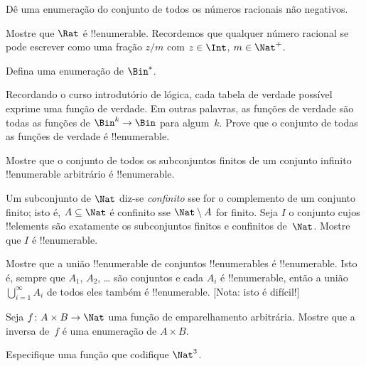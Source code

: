 \documentclass[../../../include/open-logic-section]{subfiles}
\begin{document}
\begin{prob}
Dê uma enumeração do conjunto de todos os números racionais não negativos.
\end{prob}

\begin{prob}
Mostre que $\Rat$ é !!{enumerable}. Recordemos que qualquer número racional
se pode escrever como uma fração $z/m$ com $z \in \Int$, $m \in \Nat^+$.
\end{prob}

\begin{prob}
Defina uma enumeração de $\Bin^*$.
\end{prob}

\begin{prob}
Recordando o curso introdutório de lógica, cada tabela de verdade possível
exprime uma função de verdade. Em outras palavras, as funções de verdade são todas
as funções de $\Bin^k \to \Bin$ para algum~$k$. Prove que o conjunto de todas as
funções de verdade é !!{enumerable}.
\end{prob}

\begin{prob}
Mostre que o conjunto de todos os subconjuntos finitos de um conjunto infinito
!!{enumerable} arbitrário é !!{enumerable}.
\end{prob}

\begin{prob}
Um subconjunto de $\Nat$ diz-se \emph{confinito} sse for o complemento de um
conjunto finito; isto é, $A \subseteq \Nat$ é confinito sse $\Nat\setminus A$ for
finito. Seja $I$ o conjunto cujos !!{element}s são exatamente os subconjuntos
finitos e confinitos de~$\Nat$. Mostre que $I$ é !!{enumerable}.
\end{prob}

\begin{prob}
Mostre que a união !!{enumerable} de conjuntos !!{enumerable}s é !!{enumerable}.
Isto é, sempre que $A_1$, $A_2$, \dots{} são conjuntos e cada $A_i$ é
!!{enumerable}, então a união $\bigcup_{i=1}^\infty A_i$ de todos eles também é
!!{enumerable}. [Nota: isto é difícil!]
\end{prob}

\begin{prob}
Seja $f \colon A \times B \to \Nat$ uma função de emparelhamento arbitrária. Mostre
que a inversa de~$f$ é uma enumeração de $A \times B$.
\end{prob}

\begin{prob}
Especifique uma função que codifique $\Nat^3$.
\end{prob}
\end{document}
